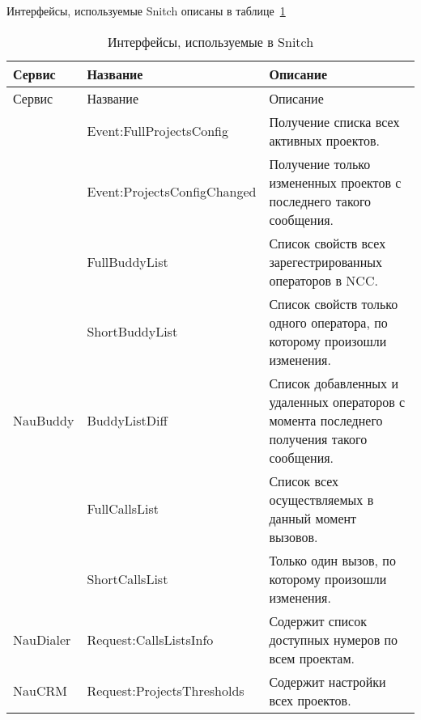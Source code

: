 Интерфейсы, используемые Snitch описаны в таблице~\ref{tab:snitch:req-intr}
\begin{small}
    \begin{longtable}{|p{}|p{}|p{}|}
        \caption{Интерфейсы, используемые в Snitch}
        \label{tab:snitch:req-intr}
        \\ \hline
        Сервис & Название & Описание \\
        \hline \endfirsthead
        \hline
        Сервис & Название & Описание \\
        \hline
        \endhead
        \hline \endlastfoot
        \multirow{2}{*}{NauQPM} & Event:FullProjectsConfig & Получение списка всех активных проектов. \\
        \cline{2-3}
                                & Event:ProjectsConfigChanged & Получение только измененных проектов с последнего такого сообщения. \\
        \hline
        \multirow{5}{*}{NauBuddy} & FullBuddyList & Список свойств всех зарегестрированных операторов в NCC\@. \\ \cline{2-3}
                                  & ShortBuddyList & Список свойств только одного оператора, по которому произошли изменения. \\ \cline{2-3}
                                  & BuddyListDiff & Список добавленных и удаленных операторов с момента последнего получения такого сообщения. \\ \cline{2-3}
                                  & FullCallsList & Список всех осуществляемых в данный момент вызовов. \\ \cline{2-3}
                                  & ShortCallsList & Только один вызов, по которому произошли изменения. \\
        \hline
        NauDialer & Request:CallsListsInfo & Содержит список доступных нумеров по всем проектам. \\
        \hline
        NauCRM & Request:ProjectsThresholds & Содержит настройки всех проектов. \\
    \end{longtable}
\end{small}

